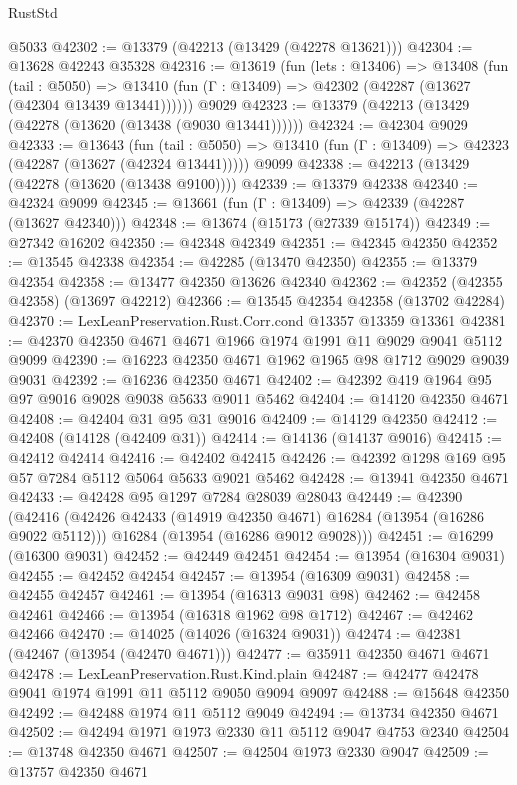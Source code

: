 \begin{lexlean}{RustStd}
\begin{coremodule}
    @5033
@42302 := @13379 (@42213 (@13429 (@42278 @13621)))
@42304 := @13628 @42243 @35328
@42316 := @13619
    (fun (lets : @13406) =>
    @13408
      (fun (tail : @5050) =>
      @13410 (fun (Γ : @13409) => @42302 (@42287 (@13627 (@42304 @13439 @13441))))))
    @9029
@42323 := @13379 (@42213 (@13429 (@42278 (@13620 (@13438 (@9030 @13441))))))
@42324 := @42304 @9029
@42333 := @13643
    (fun (tail : @5050) => @13410 (fun (Γ : @13409) => @42323 (@42287 (@13627 (@42324 @13441)))))
    @9099
@42338 := @42213 (@13429 (@42278 (@13620 (@13438 @9100))))
@42339 := @13379 @42338
@42340 := @42324 @9099
@42345 := @13661 (fun (Γ : @13409) => @42339 (@42287 (@13627 @42340)))
@42348 := @13674 (@15173 (@27339 @15174))
@42349 := @27342 @16202
@42350 := @42348 @42349
@42351 := @42345 @42350
@42352 := @13545 @42338
@42354 := @42285 (@13470 @42350)
@42355 := @13379 @42354
@42358 := @13477 @42350 @13626 @42340
@42362 := @42352 (@42355 @42358) (@13697 @42212)
@42366 := @13545 @42354 @42358 (@13702 @42284)
@42370 := LexLeanPreservation.Rust.Corr.cond @13357 @13359 @13361
@42381 := @42370 @42350 @4671 @4671 @1966 @1974 @1991 @11 @9029 @9041 @5112 @9099
@42390 := @16223 @42350 @4671 @1962 @1965 @98 @1712 @9029 @9039 @9031
@42392 := @16236 @42350 @4671
@42402 := @42392 @419 @1964 @95 @97 @9016 @9028 @9038 @5633 @9011 @5462
@42404 := @14120 @42350 @4671
@42408 := @42404 @31 @95 @31 @9016
@42409 := @14129 @42350
@42412 := @42408 (@14128 (@42409 @31))
@42414 := @14136 (@14137 @9016)
@42415 := @42412 @42414
@42416 := @42402 @42415
@42426 := @42392 @1298 @169 @95 @57 @7284 @5112 @5064 @5633 @9021 @5462
@42428 := @13941 @42350 @4671
@42433 := @42428 @95 @1297 @7284 @28039 @28043
@42449 := @42390
    (@42416
      (@42426 @42433 (@14919 @42350 @4671) @16284 (@13954 (@16286 @9022 @5112)))
      @16284
      (@13954 (@16286 @9012 @9028)))
@42451 := @16299 (@16300 @9031)
@42452 := @42449 @42451
@42454 := @13954 (@16304 @9031)
@42455 := @42452 @42454
@42457 := @13954 (@16309 @9031)
@42458 := @42455 @42457
@42461 := @13954 (@16313 @9031 @98)
@42462 := @42458 @42461
@42466 := @13954 (@16318 @1962 @98 @1712)
@42467 := @42462 @42466
@42470 := @14025 (@14026 (@16324 @9031))
@42474 := @42381 (@42467 (@13954 (@42470 @4671)))
@42477 := @35911 @42350 @4671 @4671
@42478 := LexLeanPreservation.Rust.Kind.plain
@42487 := @42477 @42478 @9041 @1974 @1991 @11 @5112 @9050 @9094 @9097
@42488 := @15648 @42350
@42492 := @42488 @1974 @11 @5112 @9049
@42494 := @13734 @42350 @4671
@42502 := @42494 @1971 @1973 @2330 @11 @5112 @9047 @4753 @2340
@42504 := @13748 @42350 @4671
@42507 := @42504 @1973 @2330 @9047
@42509 := @13757 @42350 @4671

\end{coremodule}
\end{lexlean}
